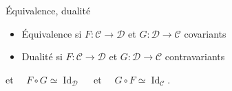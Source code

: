 \documentclass[10pt,draft]{beamer}
\newcommand{\cat}[1]{\mathscr{#1}}
\newcommand{\C}{\cat{C}}
\newcommand{\D}{\cat{D}}
\newcommand{\comp}{\circ}
\DeclareMathOperator{\Id}{Id}
\newcommand{\ra}{\rightarrow}
\begin{document}
\begin{frame}
  \begin{block}{Équivalence, dualité}
    \begin{itemize}
    \item Équivalence si $F:\C\ra\D$ et $G:\D\ra\C$ covariants 
    \item Dualité si $F:\C\ra\D$ et $G:\D\ra\C$ contravariants 
    \end{itemize}
    et $\quad F\comp G \simeq \Id_\D\quad$ et $\quad G\comp F \simeq \Id_\C$.
  \end{block}
  
\end{frame}
\end{document}
